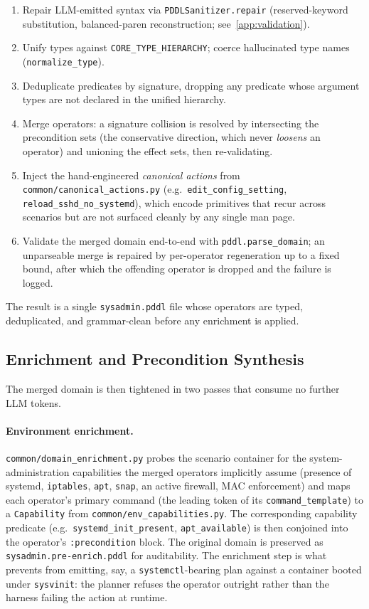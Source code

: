 \begin{enumerate}
  \item Repair LLM-emitted syntax via \texttt{PDDLSanitizer.repair} (reserved-keyword substitution, balanced-paren reconstruction; see~\ref{app:validation}).
  \item Unify types against \texttt{CORE\_TYPE\_HIERARCHY}; coerce hallucinated type names (\texttt{normalize\_type}).
  \item Deduplicate predicates by signature, dropping any predicate whose argument types are not declared in the unified hierarchy.
  \item Merge operators: a signature collision is resolved by intersecting the precondition sets (the conservative direction, which never \emph{loosens} an operator) and unioning the effect sets, then re-validating.
  \item Inject the hand-engineered \emph{canonical actions} from \texttt{common/canonical\_actions.py} (e.g.\ \texttt{edit\_config\_setting}, \texttt{reload\_sshd\_no\_systemd}), which encode primitives that recur across scenarios but are not surfaced cleanly by any single man page.
  \item Validate the merged domain end-to-end with \texttt{pddl.parse\_domain}; an unparseable merge is repaired by per-operator regeneration up to a fixed bound, after which the offending operator is dropped and the failure is logged.
\end{enumerate}

The result is a single \texttt{sysadmin.pddl} file whose operators are typed, deduplicated, and grammar-clean before any enrichment is applied.

\subsection{Enrichment and Precondition Synthesis}
\label{app:enrich}

The merged domain is then tightened in two passes that consume no further LLM tokens.

\paragraph{Environment enrichment.}
\texttt{common/domain\_enrichment.py} probes the scenario container for the system-administration capabilities the merged operators implicitly assume (presence of systemd, \texttt{iptables}, \texttt{apt}, \texttt{snap}, an active firewall, MAC enforcement) and maps each operator's primary command (the leading token of its \texttt{command\_template}) to a \texttt{Capability} from \texttt{common/env\_capabilities.py}. The corresponding capability predicate (e.g.\ \texttt{systemd\_init\_present}, \texttt{apt\_available}) is then conjoined into the operator's \texttt{:precondition} block. The original domain is preserved as \texttt{sysadmin.pre-enrich.pddl} for auditability. The enrichment step is what prevents \nsplan from emitting, say, a \texttt{systemctl}-bearing plan against a container booted under \texttt{sysvinit}: the planner refuses the operator outright rather than the harness failing the action at runtime.


